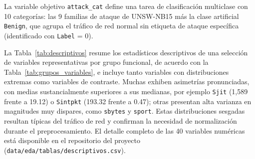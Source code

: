 \documentclass[conference]{IEEEtran}
\begin{document}
\FloatBarrier

La variable objetivo \texttt{attack\_cat} define una tarea de clasificación multiclase con 10 categorías: las 9 familias de ataque de UNSW-NB15 más la clase artificial \texttt{Benign}, que agrupa el tráfico de red normal sin etiqueta de ataque específica (identificado con \texttt{Label} = 0).

La Tabla~\ref{tab:descriptivos} resume los estadísticos descriptivos de una selección de variables representativas por grupo funcional, de acuerdo con la Tabla~\ref{tab:grupos_variables}, e incluye tanto variables con distribuciones extremas como variables de contraste. Muchas exhiben asimetrías pronunciadas, con medias sustancialmente superiores a sus medianas, por ejemplo \texttt{Sjit} (1{,}589 frente a 19.12) o \texttt{Sintpkt} (193.32 frente a 0.47); otras presentan alta varianza en magnitudes muy dispares, como \texttt{sbytes} y \texttt{sport}. Estas distribuciones sesgadas resultan típicas del tráfico de red y confirman la necesidad de normalización durante el preprocesamiento. El detalle completo de las 40 variables numéricas está disponible en el repositorio del proyecto (\texttt{data/eda/tablas/descriptivos.csv}).

\begin{table}[h!]
\centering
\caption{Estadísticos descriptivos de variables numéricas seleccionadas por grupo funcional.}
\label{tab:descriptivos}
\end{table}
\end{document}
